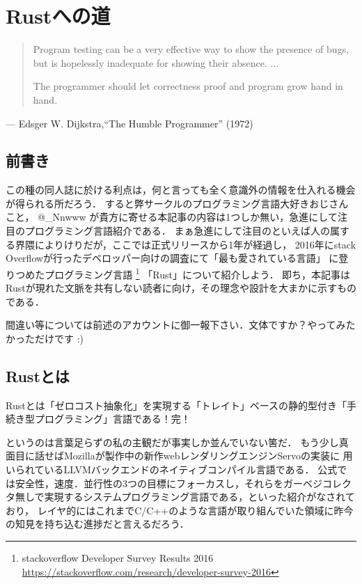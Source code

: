 \chapter{Rustへの道}
\begin{quotation}
  Program testing can be a very effective way to show the presence of bugs, \\
  but is hopelessly inadequate for showing their absence. ...

  The programmer should let correctness proof and program grow hand in hand.
\end{quotation}
\begin{flushright}
  --- Edsger W. Dijkstra,``The Humble Programmer'' (1972)
\end{flushright}

\section{前書き}
この種の同人誌に於ける利点は，何と言っても全く意識外の情報を仕入れる機会が得られる所だろう．
すると弊サークルのプログラミング言語大好きおじさんこと， @\_Nnwww が貴方に寄せる本記事の内容は1つしか無い，急進にして注目のプログラミング言語紹介である．
まぁ急進にして注目のといえば人の属する界隈によりけりだが，ここでは正式リリースから1年が経過し，
2016年にstack Overflowが行ったデベロッパー向けの調査にて「最も愛されている言語」
に登りつめたプログラミング言語
\footnote{stackoverflow Developer Survey Results 2016 \\
  \url{https://stackoverflow.com/research/developer-survey-2016}}
「Rust」について紹介しよう．
即ち，本記事はRustが現れた文脈を共有しない読者に向け，その理念や設計を大まかに示すものである．

間違い等については前述のアカウントに御一報下さい．文体ですか？やってみたかっただけです :)

\section{Rustとは}
Rustとは「ゼロコスト抽象化」を実現する「トレイト」ベースの静的型付き「手続き型プログラミング」言語である！完！

というのは言葉足らずの私の主観だが事実しか並んでいない筈だ．
もう少し真面目に話せばMozillaが製作中の新作webレンダリングエンジンServoの実装に
用いられているLLVMバックエンドのネイティブコンパイル言語である．
公式では安全性，速度．並行性の3つの目標にフォーカスし，それらをガーベジコレクタ無しで実現するシステムプログラミング言語である，といった紹介がなされており，
レイヤ的にはこれまでC/C++のような言語が取り組んでいた領域に昨今の知見を持ち込む進捗だと言えるだろう．

